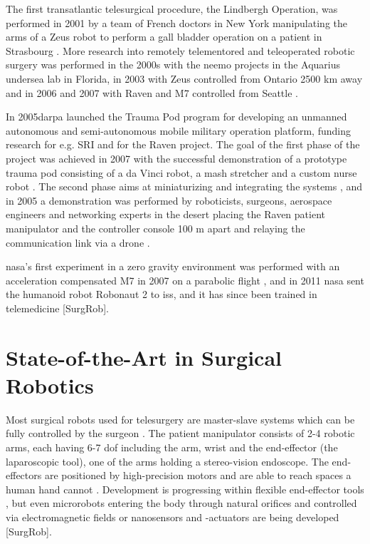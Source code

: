 The first transatlantic telesurgical procedure, the Lindbergh Operation, was performed in 2001 by a team of French doctors in New York manipulating the arms of a Zeus robot to perform a gall bladder operation on a patient in Strasbourg \citep{bib:telesurg_history}. More research into remotely telementored and teleoperated robotic surgery was performed in the 2000s with the \gls{neemo} projects in the Aquarius undersea lab in Florida, in 2003 with Zeus controlled from Ontario 2500 km away \citep[pp 75, 81]{bib:surgical_book} and in 2006 and 2007 with Raven and M7 controlled from Seattle \citep[pp 28, 82]{bib:surgical_book}. 

In 2005\gls{darpa} launched the Trauma Pod program for developing an unmanned autonomous and semi-autonomous mobile military operation platform, funding research for e.g. SRI and for the Raven project. The goal of the first phase of the project was achieved in 2007 with the successful demonstration of a prototype trauma pod consisting of a da Vinci robot, a \gls{mash} stretcher and a custom nurse robot \citep[p 30]{bib:surgical_book}. The second phase aims at miniaturizing and integrating the systems \citep[p 31]{bib:surgical_book}, and in 2005 a demonstration was performed by roboticists, surgeons, aerospace engineers and networking experts in the desert placing the Raven patient manipulator and the controller console 100 m apart and relaying the communication link via a drone \citep{bib:docatadist}.

%
%

\gls{nasa}'s first experiment in a zero gravity environment was performed with an acceleration compensated M7 in 2007 on a parabolic flight \citep[pp 29, 76, 85]{bib:surgical_book}, and in 2011 \gls{nasa} sent the humanoid robot Robonaut 2 to \gls{iss}, and it has since been trained in telemedicine [SurgRob].







\section{State-of-the-Art in Surgical Robotics}
Most surgical robots used for telesurgery are master-slave systems which can be fully controlled by the surgeon \citep{bib:raven_debride}. The patient manipulator consists of 2-4 robotic arms, each having 6-7 \gls{dof} \citep{bib:raven_debride} including the arm, wrist and the end-effector (the laparoscopic tool), one of the arms holding a stereo-vision \gls{endoscope}. The end-effectors are positioned by high-precision motors and are able to reach spaces a human hand cannot \citep{bib:docatadist}.
Development is progressing within flexible end-effector tools \citep[p 74]{bib:surgical_book}, but even microrobots entering the body through natural orifices and controlled via electromagnetic fields or nanosensors and -actuators are being developed [SurgRob].


